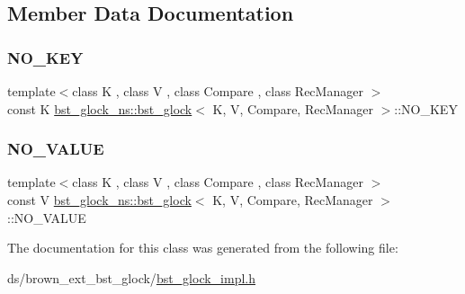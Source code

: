 \subsection{Member Data Documentation}
\mbox{\label{classbst__glock__ns_1_1bst__glock_affb054654adf46e2ef8800cdd533f4fa}} 
\subsubsection{\texorpdfstring{N\+O\+\_\+\+K\+EY}{NO\_KEY}}
{\footnotesize\ttfamily template$<$class K , class V , class Compare , class Rec\+Manager $>$ \\
const K \hyperlink{classbst__glock__ns_1_1bst__glock}{bst\+\_\+glock\+\_\+ns\+::bst\+\_\+glock}$<$ K, V, Compare, Rec\+Manager $>$\+::N\+O\+\_\+\+K\+EY}

\mbox{\label{classbst__glock__ns_1_1bst__glock_a6c0b0267a6c9ea854306e22c7f65bc53}} 
\subsubsection{\texorpdfstring{N\+O\+\_\+\+V\+A\+L\+UE}{NO\_VALUE}}
{\footnotesize\ttfamily template$<$class K , class V , class Compare , class Rec\+Manager $>$ \\
const V \hyperlink{classbst__glock__ns_1_1bst__glock}{bst\+\_\+glock\+\_\+ns\+::bst\+\_\+glock}$<$ K, V, Compare, Rec\+Manager $>$\+::N\+O\+\_\+\+V\+A\+L\+UE}



The documentation for this class was generated from the following file\+:\begin{DoxyCompactItemize}
\item 
ds/brown\+\_\+ext\+\_\+bst\+\_\+glock/\hyperlink{bst__glock__impl_8h}{bst\+\_\+glock\+\_\+impl.\+h}\end{DoxyCompactItemize}
